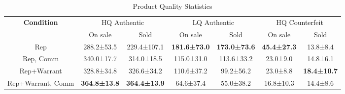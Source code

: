 \begin{table}[t]
    \centering
    \caption{Product Quality Statistics}
    \label{tab:rq3_product_quality}
    \begin{tabular}{ccccccc}
    \toprule
    \textbf{Condition} & \multicolumn{2}{c}{HQ Authentic} & \multicolumn{2}{c}{LQ Authentic} & \multicolumn{2}{c}{HQ Counterfeit} \\
     & On sale & Sold & On sale & Sold & On sale & Sold \\
    \midrule
    Rep & 288.2±53.5 & 229.4±107.1 & \textbf{181.6±73.0} & \textbf{173.0±73.6} & \textbf{45.4±27.3} & 13.8±8.4 \\
    Rep, Comm & 340.0±17.7 & 314.0±18.5 & 115.0±31.0 & 113.6±33.2 & 23.0±9.0 & 14.8±6.1 \\
    Rep+Warrant & 328.8±34.8 & 326.6±34.2 & 110.6±37.2 & 99.2±56.2 & 23.0±8.8 & \textbf{18.4±10.7} \\
    Rep+Warrant, Comm & \textbf{364.8±13.8} & \textbf{364.4±13.9} & 64.6±37.4 & 55.0±38.2 & 16.8±10.3 & 14.4±8.6 \\
    \bottomrule
    \end{tabular}
\end{table}